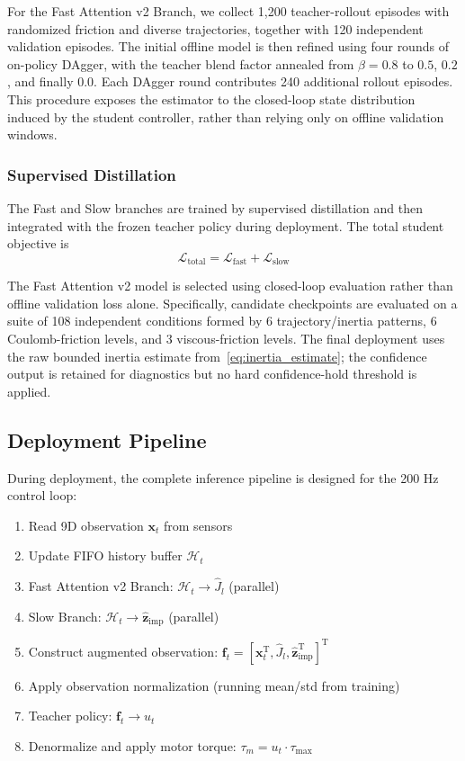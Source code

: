 \documentclass[lettersize,journal]{IEEEtran}
\begin{document}
For the Fast Attention v2 Branch, we collect 1,200 teacher-rollout episodes with randomized friction and diverse trajectories, together with 120 independent validation episodes. The initial offline model is then refined using four rounds of on-policy DAgger, with the teacher blend factor annealed from $\beta=0.8$ to $0.5$, $0.2$, and finally $0.0$. Each DAgger round contributes 240 additional rollout episodes. This procedure exposes the estimator to the closed-loop state distribution induced by the student controller, rather than relying only on offline validation windows.

\subsubsection{Supervised Distillation}

The Fast and Slow branches are trained by supervised distillation and then integrated with the frozen teacher policy during deployment. The total student objective is
\begin{equation}
\mathcal{L}_{\text{total}} = \mathcal{L}_{\text{fast}} + \mathcal{L}_{\text{slow}} \label{eq:total_loss}
\end{equation}

The Fast Attention v2 model is selected using closed-loop evaluation rather than offline validation loss alone. Specifically, candidate checkpoints are evaluated on a suite of 108 independent conditions formed by 6 trajectory/inertia patterns, 6 Coulomb-friction levels, and 3 viscous-friction levels. The final deployment uses the raw bounded inertia estimate from~\eqref{eq:inertia_estimate}; the confidence output is retained for diagnostics but no hard confidence-hold threshold is applied.

\subsection{Deployment Pipeline}

During deployment, the complete inference pipeline is designed for the 200 Hz control loop:
\begin{enumerate}
\item Read 9D observation $\bm{x}_t$ from sensors
\item Update FIFO history buffer $\mathcal{H}_t$
\item Fast Attention v2 Branch: $\mathcal{H}_t \rightarrow \hat{J}_l$ (parallel)
\item Slow Branch: $\mathcal{H}_t \rightarrow \hat{\bm{z}}_{\text{imp}}$ (parallel)
\item Construct augmented observation: $\bm{f}_t = [\bm{x}_t^\mathrm{T}, \hat{J}_l, \hat{\bm{z}}_{\text{imp}}^\mathrm{T}]^\mathrm{T}$
\item Apply observation normalization (running mean/std from training)
\item Teacher policy: $\bm{f}_t \rightarrow u_t$
\item Denormalize and apply motor torque: $\tau_m = u_t \cdot \tau_{\max}$
\end{enumerate}
\end{document}
